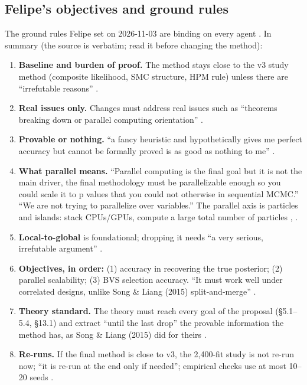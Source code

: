 \subsection{Felipe's objectives and ground rules}\label{sec:problem:rules}

The ground rules Felipe set on 2026-11-03 are binding on every agent . In summary (the source is verbatim; read it before changing the method):
\begin{enumerate}[label=\textbf{GR\arabic*}]
\item \textbf{Baseline and burden of proof.} The method stays close to the v3 study method (composite likelihood, SMC structure, HPM rule) unless there are ``irrefutable reasons'' .
\item \textbf{Real issues only.} Changes must address real issues such as ``theorems breaking down or parallel computing orientation'' .
\item \textbf{Provable or nothing.} ``a fancy heuristic and hypothetically gives me perfect accuracy but cannot be formally proved is as good as nothing to me'' .
\item \textbf{What parallel means.} ``Parallel computing is the final goal but it is not the main driver, the final methodology must be parallelizable enough so you could scale it to p values that you could not otherwise in sequential MCMC.'' ``We are not trying to parallelize over variables.'' The parallel axis is particles and islands: stack CPUs/GPUs, compute a large total number of particles , .
\item \textbf{Local-to-global} is foundational; dropping it needs ``a very serious, irrefutable argument'' .
\item \textbf{Objectives, in order:} (1) accuracy in recovering the true posterior; (2) parallel scalability; (3) BVS selection accuracy. ``It must work well under correlated designs, unlike Song \& Liang (2015) split-and-merge'' .
\item \textbf{Theory standard.} The theory must reach every goal of the proposal (§5.1–5.4, §13.1) and extract ``until the last drop'' the provable information the method has, as Song \& Liang (2015) did for theirs .
\item \textbf{Re-runs.} If the final method is close to v3, the 2,400-fit study is not re-run now; ``it is re-run at the end only if needed''; empirical checks use at most 10–20 seeds .
\end{enumerate}


